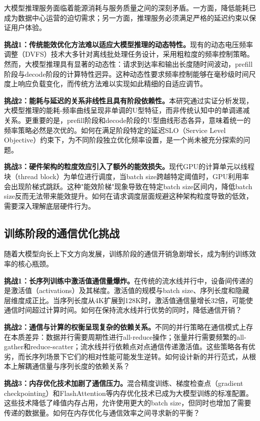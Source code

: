 大模型推理服务面临着能源消耗与服务质量之间的深刻矛盾。一方面，降低能耗已成为数据中心运营的迫切需求；另一方面，推理服务必须满足严格的延迟约束以保证用户体验。

\textbf{挑战1：传统能效优化方法难以适应大模型推理的动态特性。}现有的动态电压频率调整（DVFS）技术大多针对离线批处理任务设计，采用粗粒度的频率控制策略\cite{stojkovic2025dynamollm}。然而，大模型推理具有显著的动态性：请求到达率和输出长度随时间波动，prefill阶段与decode阶段的计算特性迥异。这种动态性要求频率控制能够在毫秒级时间尺度上响应负载变化，而传统方法难以实现如此精细的自适应调节。

\textbf{挑战2：能耗与延迟的关系非线性且具有阶段依赖性。}本研究通过实证分析发现，大模型推理的能耗-频率曲线呈现非单调的U型特征，而非传统认知中的单调递减关系。更重要的是，prefill阶段和decode阶段的U型曲线形态各异，意味着统一的频率策略必然是次优的。如何在满足阶段特定的延迟SLO（Service Level Objective）约束下，为不同阶段独立优化频率设置，是一个尚未被充分探索的问题。

\textbf{挑战3：硬件架构的粒度效应引入了额外的能效损失。}现代GPU的计算单元以线程块（thread block）为单位进行调度，当batch size跨越特定阈值时，GPU利用率会出现阶梯式跳跃。这种"能效阶梯"现象导致在特定batch size区间内，降低batch size反而无法带来能效提升。如何在请求调度层面规避这种架构粒度导致的低效，需要深入理解底层硬件行为。

\subsection{训练阶段的通信优化挑战}

随着大模型向长上下文方向发展，训练阶段的通信开销急剧增长，成为制约训练效率的核心瓶颈。

\textbf{挑战1：长序列训练中激活值通信量爆炸。}在传统的流水线并行中，设备间传递的是激活值（activations）及其梯度。激活值的规模与batch size、序列长度和隐藏层维度成正比。当序列长度从4K扩展到128K时，激活值通信量增长32倍，可能使通信时间超过计算时间。如何在保持流水线并行优势的同时，降低通信开销？

\textbf{挑战2：通信与计算的权衡呈现复杂的依赖关系。}不同的并行策略在通信模式上存在本质差异：数据并行需要周期性进行all-reduce操作；张量并行需要频繁的all-gather和reduce-scatter；流水线并行依赖点对点通信传递激活值。这些策略各有优劣，而长序列场景下它们的相对性能可能发生逆转。如何设计新的并行范式，从根本上解耦通信量与序列长度的依赖关系？

\textbf{挑战3：内存优化技术加剧了通信压力。}混合精度训练、梯度检查点（gradient checkpointing）和FlashAttention等内存优化技术已成为大模型训练的标准配置\cite{chen2016training,dao2023flashattention}。这些技术降低了峰值内存占用，允许使用更大的batch size，但同时也增加了需要传递的数据量。如何在内存优化与通信效率之间寻求新的平衡？

